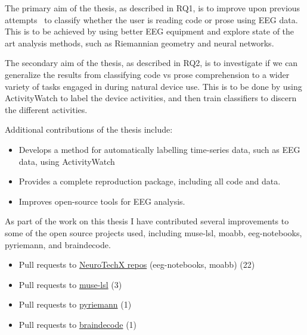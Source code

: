     The primary aim of the thesis, as described in RQ1, is to improve upon previous attempts~\cite{fucci_replication_2019} to classify whether the user is reading code or prose using EEG data. This is to be achieved by using better EEG equipment and explore state of the art analysis methods, such as Riemannian geometry and neural networks.

    The secondary aim of the thesis, as described in RQ2, is to investigate if we can generalize the results from classifying code vs prose comprehension to a wider variety of tasks engaged in during natural device use. This is to be done by using ActivityWatch to label the device activities, and then train classifiers to discern the different activities.

    Additional contributions of the thesis include:

    \begin{itemize}
        \item Develops a method for automatically labelling time-series data, such as EEG data, using ActivityWatch
        \item Provides a complete reproduction package, including all code and data.
        \item Improves open-source tools for EEG analysis.
    \end{itemize}

    As part of the work on this thesis I have contributed several improvements to some of the open source projects used, including muse-lsl, moabb, eeg-notebooks, pyriemann, and braindecode.

    \begin{itemize}
        \item Pull requests to \href{%
                https://github.com/search?q=org%
            }{NeuroTechX repos} (eeg-notebooks, moabb) (22)
        \item Pull requests to \href{%
                https://github.com/search?q=org%
            }{muse-lsl} (3)
        \item Pull requests to \href{%
                https://github.com/search?q=org%
            }{pyriemann} (1)
        \item Pull requests to \href{%
                https://github.com/search?q=org%
            }{braindecode} (1)
    \end{itemize}

